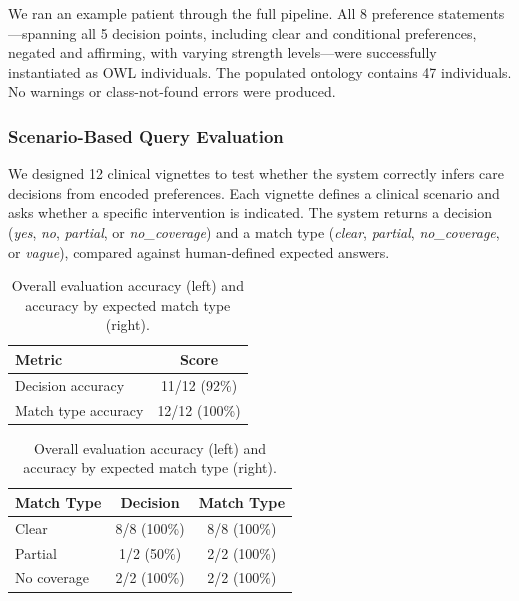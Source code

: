 \documentclass[11pt]{article}
\begin{document}
We ran an example patient through the full pipeline. All 8 preference statements---spanning all 5 decision points, including clear and conditional preferences, negated and affirming, with varying strength levels---were successfully instantiated as OWL individuals. The populated ontology contains 47 individuals. No warnings or class-not-found errors were produced.

\subsubsection{Scenario-Based Query Evaluation}

We designed 12 clinical vignettes to test whether the system correctly infers care decisions from encoded preferences. Each vignette defines a clinical scenario and asks whether a specific intervention is indicated. The system returns a decision (\textit{yes}, \textit{no}, \textit{partial}, or \textit{no\_coverage}) and a match type (\textit{clear}, \textit{partial}, \textit{no\_coverage}, or \textit{vague}), compared against human-defined expected answers.

\begin{table}[ht]
\centering
\caption{Overall evaluation accuracy (left) and accuracy by expected match type (right).}
\label{tab:summary}
\begin{tabular}{lc}
\toprule
\textbf{Metric} & \textbf{Score} \\
\midrule
Decision accuracy & 11/12 (92\%) \\
Match type accuracy & 12/12 (100\%) \\
\bottomrule
\end{tabular}
\hspace{1.5em}
\begin{tabular}{lcc}
\toprule
\textbf{Match Type} & \textbf{Decision} & \textbf{Match Type} \\
\midrule
Clear & 8/8 (100\%) & 8/8 (100\%) \\
Partial & 1/2 (50\%) & 2/2 (100\%) \\
No coverage & 2/2 (100\%) & 2/2 (100\%) \\
\bottomrule
\end{tabular}
\end{table}
\end{document}
